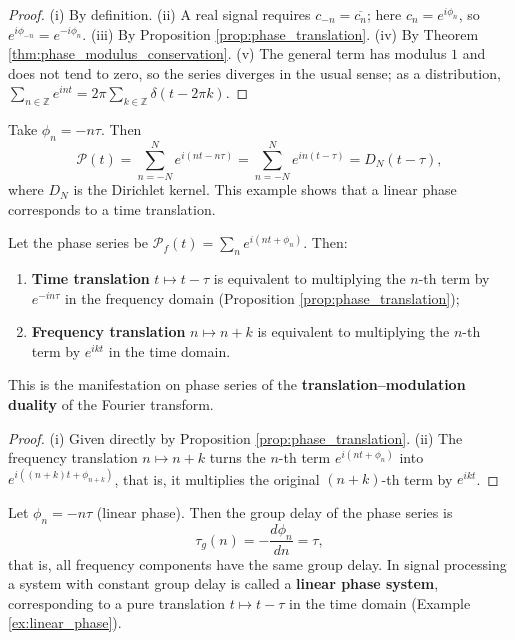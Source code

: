 \begin{proof}
(i) By definition. (ii) A real signal requires $c_{-n}=\overline{c_n}$; here $c_n=e^{i\phi_n}$, so $e^{i\phi_{-n}}=e^{-i\phi_n}$. (iii) By Proposition \ref{prop:phase_translation}. (iv) By Theorem \ref{thm:phase_modulus_conservation}. (v) The general term has modulus $1$ and does not tend to zero, so the series diverges in the usual sense; as a distribution, $\sum_{n\in\mathbb{Z}}e^{int}=2\pi\sum_{k\in\mathbb{Z}}\delta(t-2\pi k)$.
\end{proof}

\begin{example}\label{ex:linear_phase}
Take $\phi_n=-n\tau$. Then
\[
\mathcal{P}(t)=\sum_{n=-N}^{N} e^{i(nt-n\tau)}
= \sum_{n=-N}^{N} e^{in(t-\tau)}
= D_N(t-\tau),
\]
where $D_N$ is the Dirichlet kernel. This example shows that a linear phase corresponds to a time translation.
\end{example}

\begin{proposition}\label{prop:phase_rotation_translation_duality}
Let the phase series be $\mathcal{P}_f(t) = \sum_n e^{i(nt+\phi_n)}$. Then:
\begin{enumerate}[label=(\roman*)]
  \item \textbf{Time translation} $t \mapsto t - \tau$ is equivalent to multiplying the $n$-th term by $e^{-in\tau}$ in the frequency domain (Proposition \ref{prop:phase_translation});
  \item \textbf{Frequency translation} $n \mapsto n + k$ is equivalent to multiplying the $n$-th term by $e^{ikt}$ in the time domain.
\end{enumerate}
This is the manifestation on phase series of the \textbf{translation--modulation duality} of the Fourier transform.
\end{proposition}

\begin{proof}
(i) Given directly by Proposition \ref{prop:phase_translation}. (ii) The frequency translation $n \mapsto n + k$ turns the $n$-th term $e^{i(nt+\phi_n)}$ into $e^{i((n+k)t+\phi_{n+k})}$, that is, it multiplies the original $(n+k)$-th term by $e^{ikt}$.
\end{proof}

\begin{example}\label{ex:linear_phase_group_delay}
Let $\phi_n = -n\tau$ (linear phase). Then the group delay of the phase series is
\[
\tau_g(n) = -\frac{d\phi_n}{dn} = \tau,
\]
that is, all frequency components have the same group delay. In signal processing a system with constant group delay is called a \textbf{linear phase system}, corresponding to a pure translation $t \mapsto t - \tau$ in the time domain (Example \ref{ex:linear_phase}).
\end{example}


